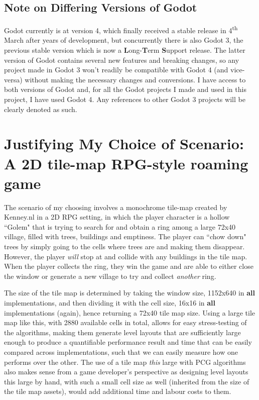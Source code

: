 \subsection{Note on Differing Versions of Godot}

Godot currently is at version 4, which finally received a stable release in 4\textsuperscript{th} March after years of development, but concurrently there is also Godot 3, the previous stable version which is now a \textbf{L}ong-\textbf{T}erm \textbf{S}upport release. The latter version of Godot contains several new features and breaking changes, so any project made in Godot 3 won't readily be compatible with Godot 4 (and vice-versa) without making the necessary changes and conversions. I have access to both versions of Godot and, for all the Godot projects I made and used in this project, I have used Godot 4. Any references to other Godot 3 projects will be clearly denoted as such.

\section{Justifying My Choice of Scenario: A 2D tile-map RPG-style roaming game}

The scenario of my choosing involves a monochrome tile-map created by Kenney.nl in a 2D RPG setting, in which the player character is a hollow ``Golem" that is trying to search for and obtain a ring among a large 72x40 village, filled with trees, buildings and emptiness. The player can ``chow down" trees by simply going to the cells where trees are and making them disappear. However, the player \textit{will} stop at and collide with any buildings in the tile map. When the player collects the ring, they win the game and are able to either close the window or generate a new village to try and collect \textit{another} ring.

The size of the tile map is determined by taking the window size, 1152x640 in \textbf{all} implementations, and then dividing it with the cell size, 16x16 in \textbf{all} implementations (again), hence returning a 72x40 tile map size. Using a large tile map like this, with 2880 available cells in total, allows for easy stress-testing of the algorithms, making them generate level layouts that are sufficiently large enough to produce a quantifiable performance result and time that can be easily compared across implementations, such that we can easily measure how one performs over the other. The use of a tile map \textit{this} large with PCG algorithms also makes sense from a game developer's perspective as designing level layouts this large by hand, with such a small cell size as well (inherited from the size of the tile map assets), would add additional time and labour costs to them. 

